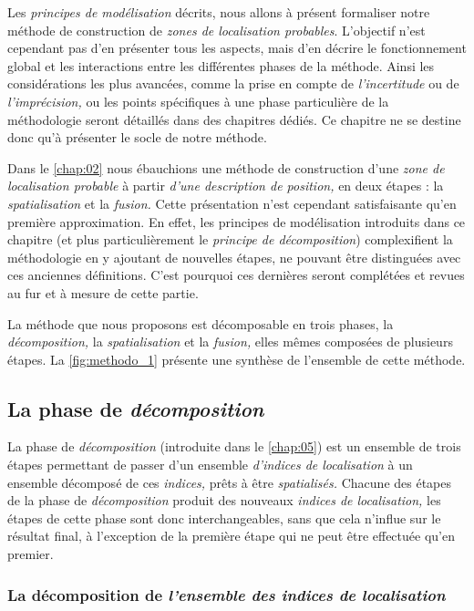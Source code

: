 Les \emph{principes de modélisation} décrits, nous allons à présent
formaliser notre méthode de construction de \emph{zones de
  localisation probables}. L'objectif n'est cependant pas d'en
présenter tous les aspects, mais d'en décrire le fonctionnement global
et les interactions entre les différentes phases de la méthode. Ainsi
les considérations les plus avancées, comme la prise en compte de
\emph{l'incertitude} ou de \emph{l'imprécision,} ou les points
spécifiques à une phase particulière de la méthodologie seront
détaillés dans des chapitres dédiés. Ce chapitre ne se destine donc
qu'à présenter le socle de notre méthode.

Dans le \autoref{chap:02} nous ébauchions une méthode de construction
d'une \emph{zone de localisation probable} à partir \emph{d'une
  description de position,} en deux étapes : la \emph{spatialisation}
et la \emph{fusion.} Cette présentation n'est cependant satisfaisante
qu'en première approximation. En effet, les principes de modélisation
introduits dans ce chapitre (et plus particulièrement le
\emph{principe de décomposition}) complexifient la méthodologie en y
ajoutant de nouvelles étapes, ne pouvant être distinguées avec ces
anciennes définitions. C'est pourquoi ces dernières seront complétées
et revues au fur et à mesure de cette partie.

La méthode que nous proposons est décomposable en trois phases, la
\emph{décomposition,} la \emph{spatialisation} et la \emph{fusion,}
elles mêmes composées de plusieurs étapes. La \autoref{fig:methodo_1}
présente une synthèse de l'ensemble de cette méthode.

\subsection{La phase de \emph{décomposition}}

La phase de \emph{décomposition} (introduite dans le
\autoref{chap:05}) est un ensemble de trois étapes permettant de
passer d'un ensemble \emph{d'indices de localisation} à un ensemble
décomposé de ces \emph{indices,} prêts à être \emph{spatialisés.}
Chacune des étapes de la phase de \emph{décomposition} produit des
nouveaux \emph{indices de localisation,} les étapes de cette phase
sont donc interchangeables, sans que cela n'influe sur le résultat
final, à l'exception de la première étape qui ne peut être effectuée
qu'en premier.

\subsubsection{La décomposition de \emph{l'ensemble des indices de
    localisation}}

